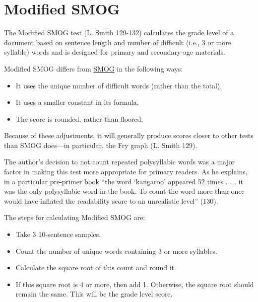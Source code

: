 \documentclass[
]{book}
\providecommand{\tightlist}{%
  \setlength{\itemsep}{0pt}\setlength{\parskip}{0pt}}
\theoremstyle{definition}
\theoremstyle{definition}
\theoremstyle{definition}
\theoremstyle{definition}
\theoremstyle{remark}
\begin{document}

\newpage

\hypertarget{modified-smog}{%
\section{\texorpdfstring{Modified SMOG}{Modified SMOG}}\label{modified-smog}}

The Modified SMOG test (L. Smith 129-132) calculates the grade level of a document based on sentence length and number of difficult (i.e., 3 or more syllable) words and is designed for primary and secondary-age materials.

Modified SMOG differs from \protect\hyperlink{smog-test}{SMOG} in the following ways:

\begin{itemize}
\tightlist
\item
  It uses the unique number of difficult words (rather than the total).
\item
  It uses a smaller constant in its formula.
\item
  The score is rounded, rather than floored.
\end{itemize}

Because of these adjustments, it will generally produce scores closer to other tests than SMOG does---in particular, the Fry graph (L. Smith 129).

The author's decision to not count repeated polysyllabic words was a major factor in making this test more appropriate for primary readers. As he explains, in a particular pre-primer book ``the word `kangaroo' appeared 52 times . . . it was the only polysyllabic word in the book. To count the word more than once would have inflated the readability score to an unrealistic level'' (130).

The steps for calculating Modified SMOG are:

\begin{itemize}
\tightlist
\item
  Take 3 10-sentence samples.
\item
  Count the number of unique words containing 3 or more syllables.
\item
  Calculate the square root of this count and round it.
\item
  If this square root is 4 or more, then add 1. Otherwise, the square root should remain the same. This will be the grade level score.
\end{itemize}
\end{document}
